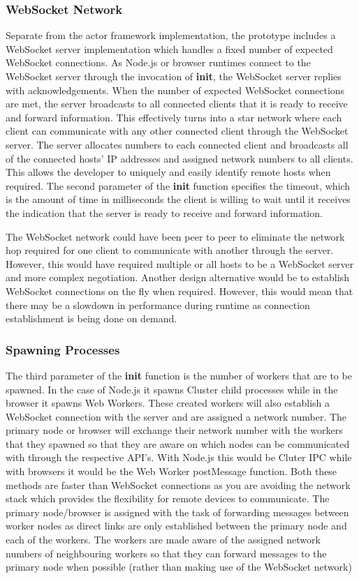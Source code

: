 \documentclass[12pt, a4paper]{report}
\theoremstyle{definition}
\theoremstyle{definition}%
\theoremstyle{definition}%
\theoremstyle{definition}%
\theoremstyle{definition}%
\theoremstyle{definition}%
\begin{document}
\subsubsection{WebSocket Network}
Separate from the actor framework implementation, the prototype includes a WebSocket server implementation which handles a fixed number of expected WebSocket connections. As Node.js or browser runtimes connect to the WebSocket server through the invocation of \textbf{init}, the WebSocket server replies with acknowledgements. When the number of expected WebSocket connections are met, the server broadcasts to all connected clients that it is ready to receive and forward information. This effectively turns into a star network where each client can communicate with any other connected client through the WebSocket server. The server allocates numbers to each connected client and broadcasts all of the connected hosts' IP addresses and assigned network numbers to all clients. This allows the developer to uniquely and easily identify remote hosts when required. The second parameter of the \textbf{init} function specifies the timeout, which is the amount of time in milliseconds the client is willing to wait until it receives the indication that the server is ready to receive and forward information.

The WebSocket network could have been peer to peer to eliminate the network hop required for one client to communicate with another through the server. However, this would have required multiple or all hosts to be a WebSocket server and more complex negotiation. Another design alternative would be to establish WebSocket connections on the fly when required. However, this would mean that there may be a slowdown in performance during runtime as connection establishment is being done on demand.

\subsubsection{Spawning Processes}
The third parameter of the \textbf{init} function is the number of workers that are to be spawned. In the case of Node.js it spawns Cluster child processes while in the browser it spawns Web Workers. These created workers will also establish a WebSocket connection with the server and are assigned a network number. The primary node or browser will exchange their network number with the workers that they spawned so that they are aware on which nodes can be communicated with through the respective API's. With Node.js this would be Cluter IPC while with browsers it would be the Web Worker postMessage function. Both these methods are faster than WebSocket connections as you are avoiding the network stack which provides the flexibility for remote devices to communicate. The primary node/browser is assigned with the task of forwarding messages between worker nodes as direct links are only established between the primary node and each of the workers. The workers are made aware of the assigned network numbers of neighbouring workers so that they can forward messages to the primary node when possible (rather than making use of the WebSocket network)
\end{document}
